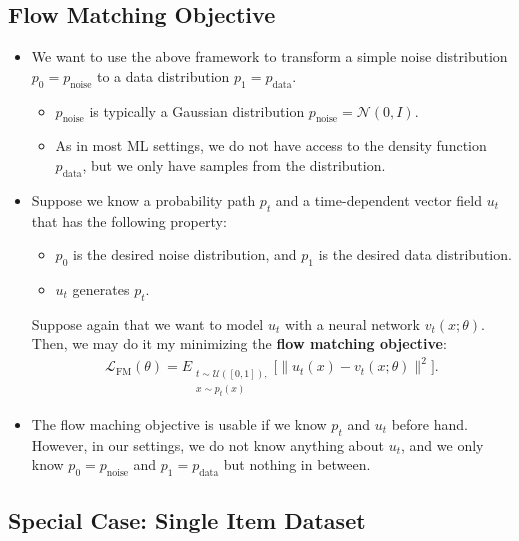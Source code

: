 \documentclass[10pt]{article}
\newcommand{\mrm}[1]{\mathrm{#1}}
\newcommand{\mcal}[1]{\mathcal{#1}}
\begin{document}
\subsection{Flow Matching Objective}

\begin{itemize}
  \item We want to use the above framework to transform a simple noise distribution $p_0 = p_{\mrm{noise}}$ to a data distribution $p_1 = p_{\mrm{data}}$.
  \begin{itemize}
    \item $p_{\mrm{noise}}$ is typically a Gaussian distribution $p_{\mrm{noise}} = \mcal{N}(0,I)$.
    \item As in most ML settings, we do not have access to the density function $p_{\mrm{data}}$, but we only have samples from the distribution.
  \end{itemize}

  \item Suppose we know a probability path $p_t$ and a time-dependent vector field $u_t$ that has the following property:
  \begin{itemize}
    \item $p_0$ is the desired noise distribution, and $p_1$ is the desired data distribution.
    \item $u_t$ generates $p_t$.
  \end{itemize}
  Suppose again that we want to model $u_t$ with a neural network $v_t(x; \theta)$. Then, we may do it my minimizing the {\bf flow matching objective}:
  \begin{align}
    \mcal{L}_{\mrm{FM}}(\theta) = E_{\substack{t \sim \mcal{U}([0,1]),\\ x \sim p_t(x)}} \big[ \| u_t(x) - v_t(x; \theta) \|^2 \big]. \label{eqn:flow-matching-loss}
  \end{align}

  \item The flow maching objective is usable if we know $p_t$ and $u_t$ before hand. However, in our settings, we do not know anything about $u_t$, and we only know $p_0 = p_{\mrm{noise}}$ and $p_1 = p_{\mrm{data}}$ but nothing in between.
\end{itemize}

\subsection{Special Case: Single Item Dataset}
\end{document}
